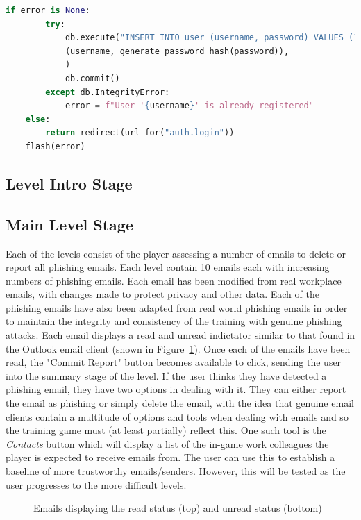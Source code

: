 \documentclass{l4proj}
\begin{document}
\begin{lstlisting}[H, language=python, caption={Registration authentication checks in the auth.py file}, label=lst:flask_auth]
    if error is None:
		try:
			db.execute("INSERT INTO user (username, password) VALUES (?, ?)",
			(username, generate_password_hash(password)),
			)
			db.commit()
		except db.IntegrityError:
			error = f"User '{username}' is already registered"
	else:
		return redirect(url_for("auth.login"))
	flash(error)
\end{lstlisting}

\subsection{Level Intro Stage}


\subsection{Main Level Stage}
Each of the levels consist of the player assessing a number of emails to delete or report all phishing emails. Each level contain 10 emails each with increasing numbers of phishing emails. Each email has been modified from real workplace emails, with changes made to protect privacy and other data. Each of the phishing emails have also been adapted from real world phishing emails in order to maintain the integrity and consistency of the training with genuine phishing attacks. Each email displays a read and unread indictator similar to that found in the Outlook email client (shown in Figure~\ref{fig:read_unread}). Once each of the emails have been read, the "Commit Report" button becomes available to click, sending the user into the summary stage of the level. If the user thinks they have detected a phishing email, they have two options in dealing with it. They can either report the email as phishing or simply delete the email, with the idea that genuine email clients contain a multitude of options and tools when dealing with emails and so the training game must (at least partially) reflect this. One such tool is the \textit{Contacts} button which will display a list of the in-game work colleagues the player is expected to receive emails from. The user can use this to establish a baseline of more trustworthy emails/senders. However, this will be tested as the user progresses to the more difficult levels.

\begin{figure}[H]
    \centering
    \caption{Emails displaying the read status (top) and unread status (bottom)}
    \label{fig:read_unread}
\end{figure}
\end{document}
